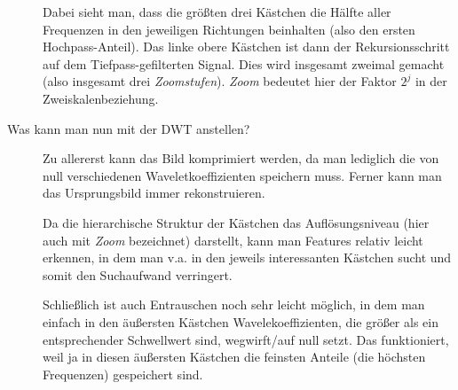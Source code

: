 \begin{description}
    Dabei sieht man, dass die größten drei Kästchen die Hälfte aller Frequenzen in den jeweiligen Richtungen
    beinhalten (also den ersten Hochpass-Anteil). Das linke obere Kästchen ist dann der Rekursionsschritt
    auf dem Tiefpass-gefilterten Signal. Dies wird insgesamt zweimal gemacht (also insgesamt drei \emph{Zoomstufen}).
    \emph{Zoom} bedeutet hier der Faktor $2^j$ in der Zweiskalenbeziehung.

  \item[Was kann man nun mit der DWT anstellen?]
    Zu allererst kann das Bild komprimiert werden, da man lediglich die von null verschiedenen Waveletkoeffizienten
    speichern muss. Ferner kann man das Ursprungsbild immer rekonstruieren.

    Da die hierarchische Struktur der Kästchen das Auflösungsniveau (hier auch mit \emph{Zoom} bezeichnet)
    darstellt, kann man Features relativ leicht erkennen, in dem man v.a. in den jeweils interessanten Kästchen sucht
    und somit den Suchaufwand verringert.


    Schließlich ist auch Entrauschen noch sehr leicht möglich, in dem man einfach in den äußersten Kästchen 
    Wavelekoeffizienten, die größer als ein entsprechender Schwellwert sind, wegwirft/auf null setzt. Das funktioniert,
    weil ja in diesen äußersten Kästchen die feinsten Anteile (die höchsten Frequenzen) gespeichert sind.
\end{description}

